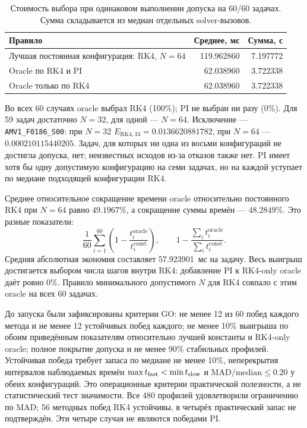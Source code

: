 \documentclass[14pt,a4paper]{extarticle}
\DeclareRobustCommand{\code}[1]{\texttt{\let\savedunderscore\_\def\_{\savedunderscore\allowbreak}#1}}
\begin{document}
\begin{table}[!htbp]
\centering
\caption{Стоимость выбора при одинаковом выполнении допуска на 60/60
задачах. Сумма складывается из медиан отдельных solver-вызовов.}
\label{tab:costpilot-selection}
\small
\begin{tabular}{p{}rr}
\toprule
Правило & Среднее, мс & Сумма, с\\
\midrule
Лучшая постоянная конфигурация: RK4, $N=64$
 & 119.962860 & 7.197772\\
Oracle по RK4 и PI
 & 62.038960 & 3.722338\\
Oracle только по RK4
 & 62.038960 & 3.722338\\
\bottomrule
\end{tabular}
\end{table}

Во всех 60 случаях oracle выбрал RK4 (100\%); PI не выбран ни разу
(0\%). Для 59 задач достаточно $N=32$, для одной --- $N=64$.
Исключение --- \code{AMV1\_F0186\_S00}: при $N=32$
$E_{\mathrm{RK4},33}=0.0136620881782$, при $N=64$ ---
$0.000210115440205$. Задач, для которых ни одна из восьми конфигураций
не достигла допуска, нет; неизвестных исходов из-за отказов также нет.
PI имеет хотя бы одну допустимую конфигурацию на семи задачах,
но на каждой уступает по медиане подходящей конфигурации RK4.

Среднее относительное сокращение времени oracle относительно постоянного
RK4 при $N=64$ равно $49.1967\%$, а сокращение суммы времён ---
$48.2849\%$. Это разные показатели:
\[
\frac1{60}\sum_{i=1}^{60}
\left(1-\frac{t_i^{\mathrm{oracle}}}{t_i^{\mathrm{const}}}\right),
\qquad
1-\frac{\sum_i t_i^{\mathrm{oracle}}}{\sum_i t_i^{\mathrm{const}}}.
\]
Средняя абсолютная экономия составляет 57.923901~мс на задачу.
Весь выигрыш достигается выбором числа шагов внутри RK4:
добавление PI к RK4-only oracle даёт ровно $0\%$.
Правило минимального допустимого $N$ для RK4 совпало с этим oracle
на всех 60 задачах.

До запуска были зафиксированы критерии GO: не менее 12 из 60 побед
каждого метода и не менее 12 устойчивых побед каждого; не менее 10\%
выигрыша по обоим приведённым показателям относительно лучшей константы
и RK4-only oracle; полное покрытие допуска и не менее 90\% стабильных
профилей. Устойчивая победа требует запаса по медиане не менее 10\%,
неперекрытия интервалов наблюдаемых времён
$\max t_{\rm fast}<\min t_{\rm slow}$ и
$\mathrm{MAD}/\mathrm{median}\le0.20$ у обеих конфигураций.
Это операционные критерии практической полезности, а не статистический
тест значимости. Все 480 профилей удовлетворили ограничению по MAD;
56 методных побед RK4 устойчивы, в четырёх практический запас не
подтверждён. Эти четыре случая не являются победами PI.
\end{document}
